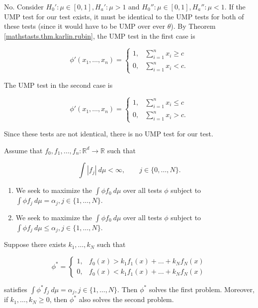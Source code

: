 \begin{solution}

No. Consider \(H_0': \mu \in [0,1], H_a': \mu > 1\) and \(H_0'': \mu \in [0,1], H_a'': \mu < 1\). If the UMP test for our test exists, it must be identical to the UMP tests for both of these tests (since it would have to be UMP over ever \(\theta\)). By Theorem \ref{mathstasts.thm.karlin.rubin}, the UMP test in the first case is 

\[
\phi'(x_1, \ldots, x_n) = \begin{cases}
1, & \sum_{i=1}^n x_i \geq c \\
0, & \sum_{i=1}^n x_i < c.
\end{cases}
\]

The UMP test in the second case is 

\[
\phi'(x_1, \ldots, x_n) = \begin{cases}
1, & \sum_{i=1}^n x_i \leq c \\
0, & \sum_{i=1}^n x_i > c.
\end{cases}
\]

Since these tests are not identical, there is no UMP test for our test.

\end{solution}

\begin{theorem}

Assume that \(f_0, f_1, \ldots, f_n: \mathbb{R}^d \to \mathbb{R}\) such that 

\[
\int |f_j| \ d\mu < \infty, \qquad j \in \{0, \ldots, N\}.
\]

\begin{enumerate}

\item

We seek to maximize the \(\int \phi  f_0 \ d\mu \) over all tests \(\phi\) subject to \(\int \phi f_j \ d\mu = \alpha_j, j \in \{1, \ldots, N\}\). 

\item

We seek to maximize the \(\int \phi  f_0 \ d\mu \) over all tests \(\phi\) subject to \(\int \phi f_j \ d\mu \leq \alpha_j, j \in \{1, \ldots, N\}\). 

\end{enumerate}

Suppose there exists \(k_1, \ldots, k_N\) such that 

\[
\phi^* = \begin{cases}
1, & f_0(x) > k_1 f_1(x) + \ldots + k_N f_N(x) \\
0, & f_0(x) < k_1 f_1(x) + \ldots + k_N f_N(x) 
\end{cases}
\]

satisfies \(\int \phi^* f_j \ d\mu = \alpha_j, j \in \{1, \ldots, N\} \). Then \(\phi^*\) solves the first problem. Moreover, if \(k_1, \ldots, k_N \geq 0\), then \(\phi^*\) also solves the second problem.

\end{theorem}

